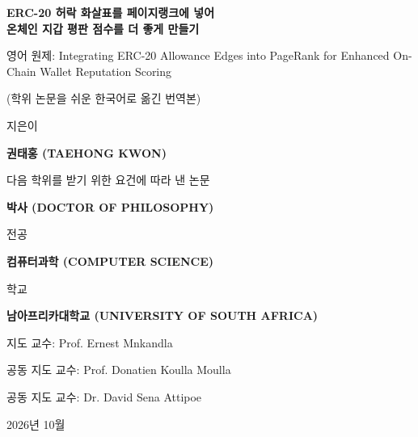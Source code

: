 \begin{titlepage}
\centering
\vspace*{0.4cm}
{\Large\bfseries ERC-20 허락 화살표를 페이지랭크에 넣어\\온체인 지갑 평판 점수를 더 좋게 만들기\par}
\vspace{0.5cm}
{\small 영어 원제: Integrating ERC-20 Allowance Edges into PageRank for Enhanced On-Chain Wallet Reputation Scoring\par}
\vspace{0.3cm}
{\small (학위 논문을 쉬운 한국어로 옮긴 번역본)\par}
\vfill
{지은이\par}
\vspace{0.7cm}
{\large\bfseries 권태홍 (TAEHONG KWON)\par}
\vfill
{다음 학위를 받기 위한 요건에 따라 낸 논문\par}
\vspace{0.7cm}
{\large\bfseries 박사 (DOCTOR OF PHILOSOPHY)\par}
\vspace{0.35cm}
{전공\par}
\vspace{0.7cm}
{\large\bfseries 컴퓨터과학 (COMPUTER SCIENCE)\par}
\vfill
{학교\par}
\vspace{0.7cm}
{\large\bfseries 남아프리카대학교 (UNIVERSITY OF SOUTH AFRICA)\par}
\vfill
{지도 교수: Prof. Ernest Mnkandla\par}
\vspace{0.35cm}
{공동 지도 교수: Prof. Donatien Koulla Moulla\par}
\vspace{0.35cm}
{공동 지도 교수: Dr. David Sena Attipoe\par}
\vfill
{2026년 10월\par}
\end{titlepage}
\restoregeometry
